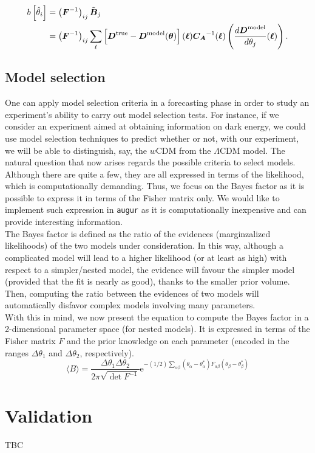 \documentclass[modern]{lsstdescnote}
\begin{document}
\begin{align}
  \begin{split}
  b\left[\hat{\theta}_{i}\right]&=\left(\boldsymbol{F}^{-1}\right)_{i j} \Tilde{\boldsymbol{B}}_{j}\\
  &=\left(\boldsymbol{F}^{-1}\right)_{i j}\sum_{\ell}\left[\boldsymbol{D}^{\mathrm{true}}-\boldsymbol{D}^{\mathrm{model}}(\boldsymbol{\theta})\right](\boldsymbol{\ell})\boldsymbol{C_A}^{-1}(\boldsymbol{\ell})\left(\dfrac{d\boldsymbol{D}^{\mathrm{model}}}{d\theta_j}(\boldsymbol{\ell})\right).
  \end{split}
  \end{align}


\subsection{Model selection}
One can apply model selection criteria in a forecasting phase in order to study an experiment's ability to carry out model selection tests.
For instance, if we consider an experiment aimed at obtaining information on dark energy, we could use model selection techniques to predict whether or not,
with our experiment, we will be able to distinguish, say, the $w$CDM from the $\Lambda$CDM model.
The natural question that now arises regards the possible criteria to select models. Although there are quite a few, they are all expressed in terms of the likelihood,
which is computationally demanding. Thus, we focus on the Bayes factor as it is possible to express it in terms of the Fisher matrix only. We would like to implement
such expression in {\tt augur} as it is computationally inexpensive and can provide interesting information.\\
The Bayes factor is defined as the ratio of the evidences (marginzalized likelihoods) of the two models under consideration.
In this way, although a complicated model will lead to a higher likelihood (or at least as high) with respect to a simpler/nested model, the evidence will favour
the simpler model (provided that the fit is nearly as good), thanks to the smaller prior volume. 
Then, computing the ratio between the evidences of two models will automatically disfavor complex models involving many parameters.\\
With this in mind, we now present the equation to compute the Bayes factor in a 2-dimensional parameter space (for nested models). It is expressed in terms of the Fisher matrix $F$ and the prior knowledge
on each parameter (encoded in the ranges $\Delta \theta_{1}$ and $\Delta \theta_{2}$, respectively). 
\begin{equation}
  \langle B\rangle=\frac{\Delta \theta_{1} \Delta \theta_{2}}{2 \pi \sqrt{\operatorname{det} F^{-1}}} \mathrm{e}^{-(1 / 2) \sum_{\alpha \beta}\left(\theta_{\alpha}-\theta_{\alpha}^{*}\right) F_{\alpha \beta}\left(\theta_{\beta}-\theta_{\beta}^{*}\right)}
\end{equation}


\section{Validation}

TBC


%




\end{document}

